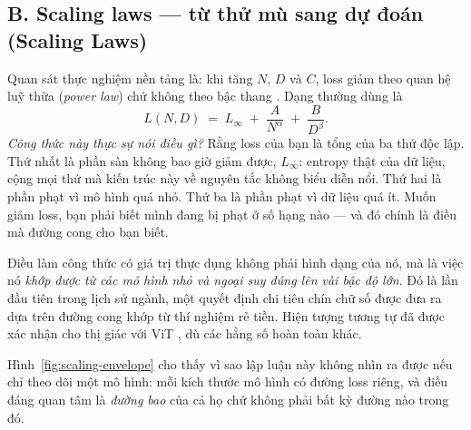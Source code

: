 \documentclass[../../../deep_learning.tex]{subfiles}
\begin{document}
\subsection{B. Scaling laws --- từ thử mù sang dự đoán (Scaling Laws)}
Quan sát thực nghiệm nền tảng là: khi tăng $N$, $D$ và $C$, loss giảm theo quan hệ luỹ thừa (\emph{power law}) chứ không theo bậc thang \cite{kaplan2020scaling}. Dạng thường dùng là
\[
L(N, D) \;=\; L_\infty \;+\; \frac{A}{N^{\alpha}} \;+\; \frac{B}{D^{\beta}} .
\]
\emph{Công thức này thực sự nói điều gì?} Rằng loss của bạn là tổng của ba thứ độc lập. Thứ nhất là phần sàn không bao giờ giảm được, $L_\infty$: entropy thật của dữ liệu, cộng mọi thứ mà kiến trúc này về nguyên tắc không biểu diễn nổi. Thứ hai là phần phạt vì mô hình quá nhỏ. Thứ ba là phần phạt vì dữ liệu quá ít. Muốn giảm loss, bạn phải biết mình đang bị phạt ở số hạng nào --- và đó chính là điều mà đường cong cho bạn biết.

Điều làm công thức có giá trị thực dụng không phải hình dạng của nó, mà là việc nó \emph{khớp được từ các mô hình nhỏ và ngoại suy đúng lên vài bậc độ lớn}. Đó là lần đầu tiên trong lịch sử ngành, một quyết định chi tiêu chín chữ số được đưa ra dựa trên đường cong khớp từ thí nghiệm rẻ tiền. Hiện tượng tương tự đã được xác nhận cho thị giác với ViT \cite{zhai2022scalingvit}, dù các hằng số hoàn toàn khác.

Hình~\ref{fig:scaling-envelope} cho thấy vì sao lập luận này không nhìn ra được nếu chỉ theo dõi một mô hình: mỗi kích thước mô hình có đường loss riêng, và điều đáng quan tâm là \emph{đường bao} của cả họ chứ không phải bất kỳ đường nào trong đó.
\end{document}
